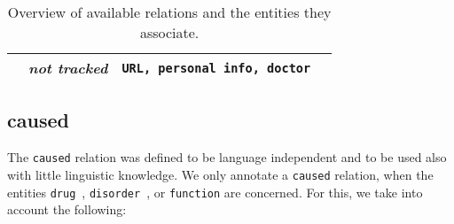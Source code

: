 \documentclass[12pt]{article}
\theoremstyle{definition}
\newcommand{\dis}{\texttt{disorder}\ }
\newcommand{\dr}{\texttt{drug}\ }
\begin{document}
\begin{table}[H]
\begin{tabular}{@{}llll@{}}
& \textit{not tracked} & \texttt{URL, personal info, doctor} & \\
\bottomrule
\end{tabular}
\caption{Overview of available relations and the entities they associate.}
\label{tab:relations}
\end{table}




\subsection{caused}\label{rel_caused}



The \texttt{caused} relation was defined to be language independent and to be used also with little linguistic knowledge.
We only annotate a \texttt{caused} relation, when the entities \dr, \dis, or \texttt{function} are concerned. 
For this, we take into account the following:
\end{document}
